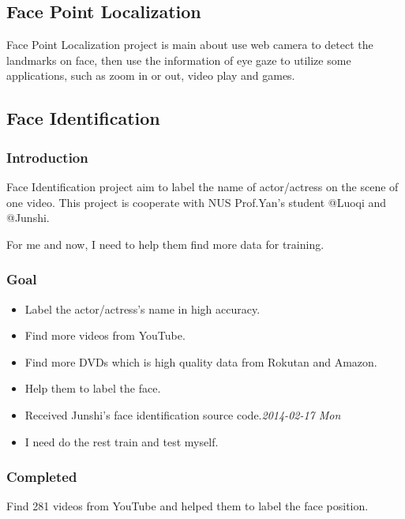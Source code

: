 \documentclass[CJK]{cctart}
\begin{document}
\subsection{Face Point Localization}
\label{sec-1-2}

Face Point Localization project is main about use web camera to
detect the landmarks on face, then use the information of eye gaze to
utilize some applications, such as zoom in or out, video play and
games.
\subsection{Face Identification}
\label{sec-1-3}
\subsubsection{Introduction}
\label{sec-1-3-1}

Face Identification project aim to label the name of actor/actress on
the scene of one video. This project is cooperate with NUS Prof.Yan's
student @Luoqi and @Junshi.

For me and now, I need to help them find more data for training.
\subsubsection{Goal}
\label{sec-1-3-2}
\label{ecbc34be-f033-4ce4-9b44-6f63c2a441a5}

\begin{itemize}
\item Label the actor/actress's name in high accuracy.
\item Find more videos from YouTube.
\item Find more DVDs which is high quality data from Rokutan and Amazon.
\item Help them to label the face.
\item Received Junshi's face identification source code.\textit{2014-02-17 Mon}
\item I need do the rest train and test myself.
\end{itemize}
\subsubsection{Completed}
\label{sec-1-3-3}

Find 281 videos from YouTube and helped them to label the face position.
\end{document}
